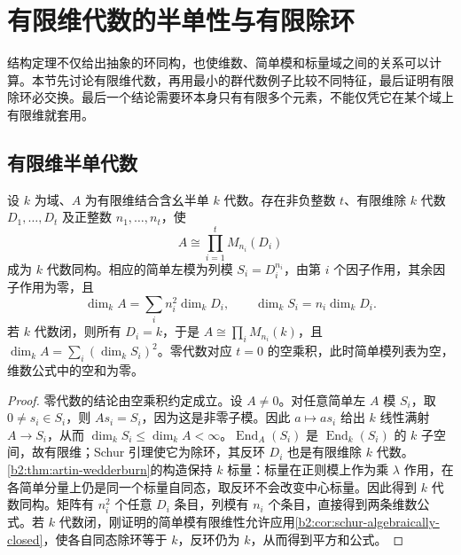 
\section{有限维代数的半单性与有限除环}
\label{b2:sec:1304}

结构定理不仅给出抽象的环同构，也使维数、简单模和标量域之间的关系可以计算。本节先讨论有限维代数，再用最小的群代数例子比较不同特征，最后证明有限除环必交换。最后一个结论需要环本身只有有限多个元素，不能仅凭它在某个域上有限维就套用。

%
%
%

\subsection{有限维半单代数}
\label{b2:subsec:1304:01}

\begin{proposition}\label{b2:prop:finite-dimensional-semisimple-algebra}
	设 \(k\) 为域、\(A\) 为有限维结合含幺半单 \(k\) 代数。存在非负整数 \(t\)、有限维除 \(k\) 代数 \(D_1,\ldots,D_t\) 及正整数 \(n_1,\ldots,n_t\)，使
	\[
		A\cong\prod_{i=1}^tM_{n_i}(D_i)
	\]
	成为 \(k\) 代数同构。相应的简单左模为列模 \(S_i=D_i^{n_i}\)，由第 \(i\) 个因子作用，其余因子作用为零，且
	\[
		\dim_kA=\sum_i n_i^2\dim_kD_i, \qquad \dim_kS_i=n_i\dim_kD_i.
	\]
	若 \(k\) 代数闭，则所有 \(D_i=k\)，于是 \(A\cong\prod_iM_{n_i}(k)\)，且 \(\dim_kA=\sum_i(\dim_kS_i)^2\)。零代数对应 \(t=0\) 的空乘积，此时简单模列表为空，维数公式中的空和为零。
\end{proposition}
\begin{proof}
	零代数的结论由空乘积约定成立。设 \(A\ne0\)。对任意简单左 \(A\) 模 \(S_i\)，取 \(0\ne s_i\in S_i\)，则 \(As_i=S_i\)，因为这是非零子模。因此 \(a\mapsto as_i\) 给出 \(k\) 线性满射 \(A\to S_i\)，从而 \(\dim_kS_i\le\dim_kA<\infty\)。\(\operatorname{End}_A(S_i)\) 是 \(\operatorname{End}_k(S_i)\) 的 \(k\) 子空间，故有限维；Schur 引理使它为除环，其反环 \(D_i\) 也是有限维除 \(k\) 代数。\cref{b2:thm:artin-wedderburn}的构造保持 \(k\) 标量：标量在正则模上作为乘 \(\lambda\) 作用，在各简单分量上仍是同一个标量自同态，取反环不会改变中心标量。因此得到 \(k\) 代数同构。矩阵有 \(n_i^2\) 个任意 \(D_i\) 条目，列模有 \(n_i\) 个条目，直接得到两条维数公式。若 \(k\) 代数闭，刚证明的简单模有限维性允许应用\cref{b2:cor:schur-algebraically-closed}，使各自同态除环等于 \(k\)，反环仍为 \(k\)，从而得到平方和公式。
\end{proof}

